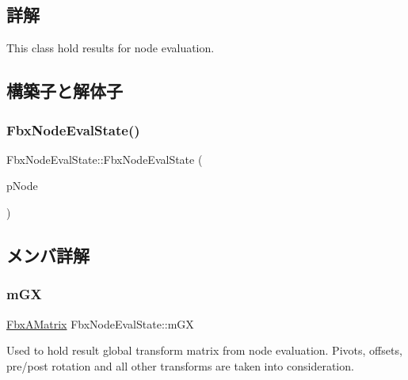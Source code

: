 \subsection{詳解}
This class hold results for node evaluation. 

\subsection{構築子と解体子}
\mbox{\label{class_fbx_node_eval_state_af0a429632794570efff26a30fc94b5e0}} 
\subsubsection{\texorpdfstring{Fbx\+Node\+Eval\+State()}{FbxNodeEvalState()}}
{\footnotesize\ttfamily Fbx\+Node\+Eval\+State\+::\+Fbx\+Node\+Eval\+State (\begin{DoxyParamCaption}\item[{\hyperlink{class_fbx_node}{Fbx\+Node} $\ast$}]{p\+Node }\end{DoxyParamCaption})}



\subsection{メンバ詳解}
\mbox{\label{class_fbx_node_eval_state_a28e9c56c4abd928db69ea10e46656994}} 
\subsubsection{\texorpdfstring{m\+GX}{mGX}}
{\footnotesize\ttfamily \hyperlink{class_fbx_a_matrix}{Fbx\+A\+Matrix} Fbx\+Node\+Eval\+State\+::m\+GX}



Used to hold result global transform matrix from node evaluation. Pivots, offsets, pre/post rotation and all other transforms are taken into consideration. 

\mbox{\label{class_fbx_node_eval_state_ac630f31b0915572e2a4e248b20c3b447}} 
